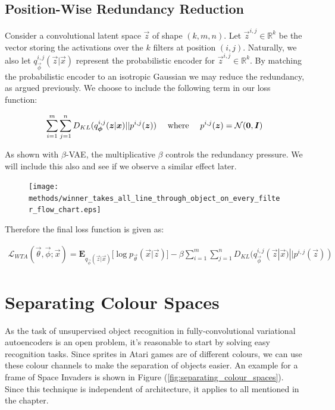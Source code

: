 \subsection{Position-Wise Redundancy Reduction}

Consider a convolutional latent space $\vec{z}$ of shape $(k, m, n)$. Let $\vec{z}^{i,j} \in \mathbb{R}^k$ be the vector storing the activations over the $k$ filters at position $(i, j)$. Naturally, we also let $q_{\vec{\phi}}^{i, j}(\vec{z} | \vec{x})$ represent the probabilistic encoder for $\vec{z}^{i,j}\in \mathbb{R}^k$. By matching the probabilistic encoder to an isotropic Gaussian we may reduce the redundancy, as argued previously. We choose to include the following term in our loss function:

\begin{align}
\sum_{i=1}^m \sum_{j=1}^n D_{KL}(q_{\vec{\phi}}^{i, j}(\vec{z} | \vec{x}) || p^{i,j}(\vec{z}))  \quad \textup{ where } \quad p^{i,j}(\vec{z}) = \mathcal{N}(\vec{0}, \vec{I})
\end{align}

As shown with $\beta$-VAE, the multiplicative $\beta$ controls the redundancy pressure. We will include this also and see if we observe a similar effect later.

\begin{figure}[h!]
\centering
\captionsetup{justification=centering}
\texttt{[image: methods/winner\_takes\_all\_line\_through\_object\_on\_every\_filter\_flow\_chart.eps]}
\label{fig:winner_takes_all_line_through_object_on_every_filter}
\end{figure}

Therefore the final loss function is given as:

\begin{align}
\mathcal{L}_{WTA}(\vec{\theta}, \vec{\phi}; \vec{x}) = \mathbf{E}_{q_{\vec{\phi}}(\vec{z} | \vec{x})} \big[ \log p_{\vec{\theta}}(\vec{x} | \vec{z}) \big] - \beta \sum_{i=1}^m \sum_{j=1}^n D_{KL}(q_{\vec{\phi}}^{i, j}(\vec{z} | \vec{x}) || p^{i,j}(\vec{z})) 
\end{align}





%
%
%
%
%
\section{Separating Colour Spaces}

As the task of unsupervised object recognition in fully-convolutional variational autoencoders is an open problem, it's reasonable to start by solving easy recognition tasks. Since sprites in Atari games are of different colours, we can use these colour channels to make the separation of objects easier. An example for a frame of Space Invaders is shown in Figure (\ref{fig:separating_colour_spaces}). Since this technique is independent of architecture, it applies to all mentioned in the chapter.

